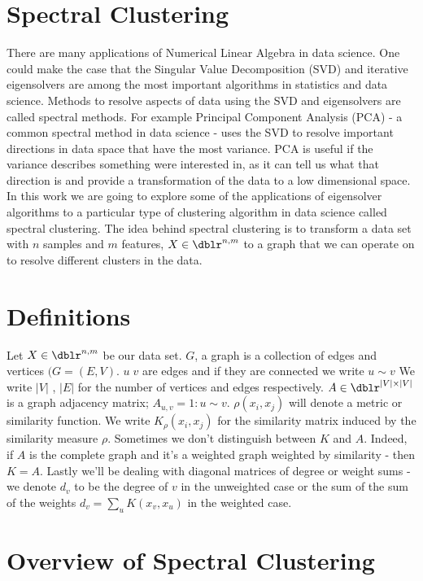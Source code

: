 
\section*{Spectral Clustering}

There are many applications of Numerical Linear Algebra in data science. One could make the case that the Singular Value Decomposition (SVD) and iterative eigensolvers are among the most important algorithms in statistics and  data science. Methods to resolve aspects of data using the SVD and eigensolvers are called spectral methods. For example Principal Component Analysis (PCA) -  a common spectral method in data science - uses the SVD to resolve important directions in data space that have the most variance. PCA is useful if the variance describes something were interested in, as it can tell us what that direction is and provide a transformation of the data to a low dimensional space.  In this work we are going to explore some of the applications of eigensolver algorithms to a particular type of clustering algorithm in data science called spectral clustering. The idea behind spectral clustering is to transform a data set with $n$ samples and $m$ features, $X \in \dblr^{n,m}$ to a graph that we can operate on to resolve different clusters in the data.  

\section*{Definitions}
Let $X \in \dblr^{n,m}$ be our data set.  $G$, a graph is a collection of edges and vertices $(G=(E,V)$. $u \; v$ are edges and if they are connected we write $u \sim v$ We write $|V|$ , $|E|$ for the number of vertices and edges respectively. $A \in \dblr^{|V| \times |V| }$ is a graph adjacency matrix; $A_{u,v} = 1 : u \sim v$. $\rho(x_i,x_j)$ will denote a metric or similarity function. We write $K_{\rho}(x_i,x_j)$ for the similarity matrix induced by the similarity measure $\rho$. Sometimes we don't distinguish between $K$ and $A$.  Indeed, if $A$ is the complete graph and it's a weighted graph weighted by similarity - then $K=A$.  Lastly we'll be dealing with diagonal matrices of degree or weight sums - we denote $d_v$ to be the degree of $v$ in the unweighted case or the sum of the sum of the weights $d_v = \sum_{u} K(x_v,x_u)$  in the weighted case.   

\section*{Overview of Spectral Clustering}


